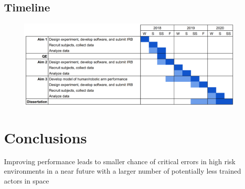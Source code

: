 \documentclass{paper}
\begin{document}
\subsection{Timeline}

\begin{figure}[h!]
    \begin{center}
        \includegraphics[width=\linewidth]{img/image1.png}
    \end{center}
\end{figure}

\section{Conclusions}
Improving performance leads to smaller chance of critical errors in high risk environments in a near future with a larger number of potentially less trained actors in space



\end{document}
